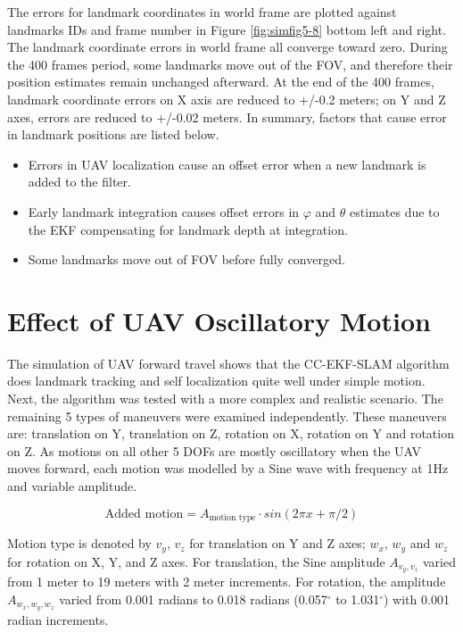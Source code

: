 The errors for landmark coordinates in world frame are plotted
against landmarks IDs and frame number in Figure \ref{fig:simfig5-8}
bottom left and right. The landmark coordinate errors in world frame
all converge toward zero. During the 400 frames period, some
landmarks move out of the FOV, and therefore their position estimates
remain unchanged afterward. At the end of the 400 frames, landmark
coordinate errors on X axis are reduced to +/-0.2 meters; on Y and Z axes,
errors are reduced to +/-0.02 meters. In summary, factors that cause
error in landmark positions are listed below. 

\begin{itemize}
  \item Errors in UAV localization cause an offset error when a new
  landmark is added to the filter.
  \item Early landmark integration causes offset errors in $\varphi$
  and $\theta$ estimates due to the EKF compensating for landmark depth at
  integration.
  \item Some landmarks move out of FOV before fully converged.
\end{itemize}
\FloatBarrier

\section{Effect of UAV Oscillatory Motion}
The simulation of UAV forward travel shows that the
CC-EKF-SLAM algorithm does landmark tracking and self localization
quite well under simple motion. Next, the algorithm was tested with a
more complex and realistic scenario. The remaining 5 types of
maneuvers were examined independently. These maneuvers are:
translation on Y, translation on Z, rotation on X, rotation on Y and
rotation on Z. As motions on all other 5 DOFs are mostly oscillatory
when the UAV moves forward, each motion was modelled by a Sine wave
with frequency at 1Hz and variable amplitude.

$$\text{Added motion} = A_{\text{motion type}}\cdot sin(2\pi x+\pi/2)$$

Motion type is denoted by $v_y$, $v_z$ for translation on Y and Z
axes; $w_x$, $w_y$ and $w_z$ for rotation on X, Y, and Z axes. For
translation, the Sine amplitude $A_{v_y,v_z}$ varied from 1 meter to
19 meters with 2 meter increments. For rotation, the amplitude
$A_{w_x,w_y,w_z}$ varied from 0.001 radians to 0.018 radians
(0.057$^\circ$ to 1.031$^\circ$) with 0.001 radian increments.

